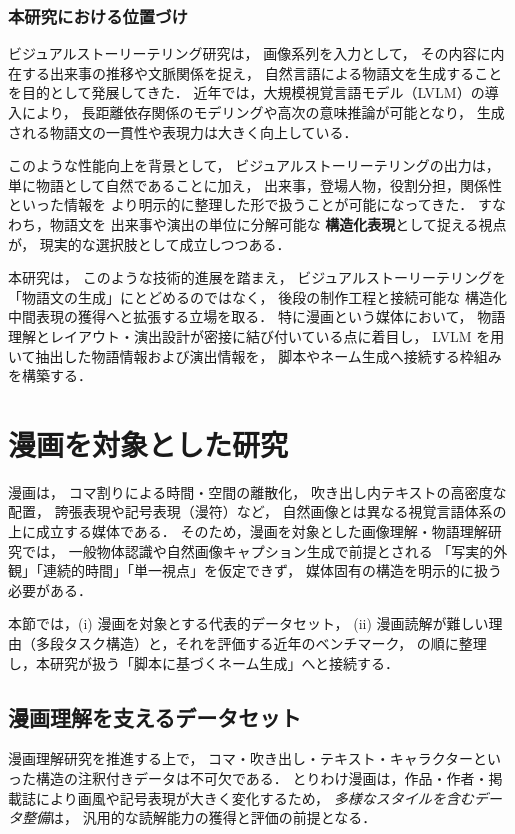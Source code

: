 \documentclass[a4j,12pt,dvipdfmx]{jsreport}
\begin{document}
\subsubsection{本研究における位置づけ}

ビジュアルストーリーテリング研究は，
画像系列を入力として，
その内容に内在する出来事の推移や文脈関係を捉え，
自然言語による物語文を生成することを目的として発展してきた．
近年では，大規模視覚言語モデル（LVLM）の導入により，
長距離依存関係のモデリングや高次の意味推論が可能となり，
生成される物語文の一貫性や表現力は大きく向上している．

このような性能向上を背景として，
ビジュアルストーリーテリングの出力は，
単に物語として自然であることに加え，
出来事，登場人物，役割分担，関係性といった情報を
より明示的に整理した形で扱うことが可能になってきた．
すなわち，物語文を
出来事や演出の単位に分解可能な
\textbf{構造化表現}として捉える視点が，
現実的な選択肢として成立しつつある．

本研究は，
このような技術的進展を踏まえ，
ビジュアルストーリーテリングを
「物語文の生成」にとどめるのではなく，
後段の制作工程と接続可能な
構造化中間表現の獲得へと拡張する立場を取る．
特に漫画という媒体において，
物語理解とレイアウト・演出設計が密接に結び付いている点に着目し，
LVLM を用いて抽出した物語情報および演出情報を，
脚本やネーム生成へ接続する枠組みを構築する．


\section{漫画を対象とした研究}
\label{sec:manga}

漫画は，
コマ割りによる時間・空間の離散化，
吹き出し内テキストの高密度な配置，
誇張表現や記号表現（漫符）など，
自然画像とは異なる視覚言語体系の上に成立する媒体である．
そのため，漫画を対象とした画像理解・物語理解研究では，
一般物体認識や自然画像キャプション生成で前提とされる
「写実的外観」「連続的時間」「単一視点」を仮定できず，
媒体固有の構造を明示的に扱う必要がある．

本節では，(i) 漫画を対象とする代表的データセット，
(ii) 漫画読解が難しい理由（多段タスク構造）と，それを評価する近年のベンチマーク，
の順に整理し，本研究が扱う「脚本に基づくネーム生成」へと接続する．


\subsection{漫画理解を支えるデータセット}
\label{sec:manga_datasets}

漫画理解研究を推進する上で，
コマ・吹き出し・テキスト・キャラクターといった構造の注釈付きデータは不可欠である．
とりわけ漫画は，作品・作者・掲載誌により画風や記号表現が大きく変化するため，
\emph{多様なスタイルを含むデータ整備}は，
汎用的な読解能力の獲得と評価の前提となる．
\end{document}
